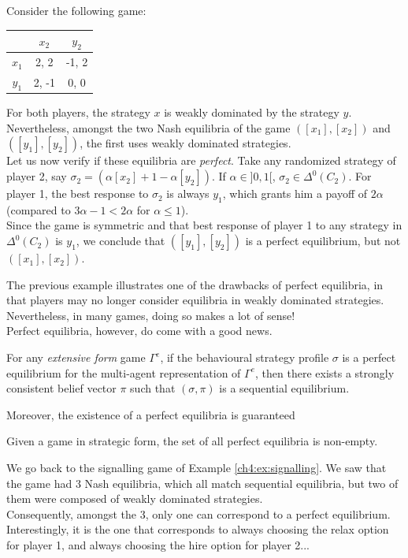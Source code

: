 \begin{example}
Consider the following game:
\begin{center}
\begin{tabular}{c | c  c}
& $x_2$ & $y_2$ \\
\hline 
$x_1$ & 2, 2 & -1, 2 \\ 
$y_1$ & 2, -1 & 0, 0
\end{tabular}
\end{center}
For both players, the strategy $x$ is weakly dominated by the strategy $y$. 
Nevertheless, amongst the two Nash equilibria of the game $([x_1],[x_2])$ and $([y_1],[y_2])$, the first uses weakly dominated strategies. \\
Let us now verify if these equilibria are \emph{perfect}. 
Take  any randomized strategy of player 2, say $\sigma_2 = (\alpha [x_2] + 1- \alpha [y_2])$. If $\alpha \in ]0,1[$, $\sigma_2 \in \Delta^0(C_2)$. For player 1, the best response to $\sigma_2$ is always $y_1$, which grants him a payoff of $2 \alpha$ (compared to $3\alpha - 1 < 2 \alpha$ for $\alpha \leq 1$).\\
Since the game is symmetric and that  best response of player 1 to any strategy in $\Delta^0(C_2)$ is $y_1$, we conclude that $([y_1], [y_2])$ is a perfect equilibrium, but not $([x_1],[x_2])$.
\end{example}

The previous example illustrates one of the drawbacks of perfect equilibria, in that players may no longer consider equilibria in weakly dominated strategies. Nevertheless, in many games, doing so makes a lot of sense!\\
Perfect equilibria, however, do come with a good news. 
\begin{theorem}
For any \emph{extensive form} game $\Gamma^e$, if the behavioural strategy profile $\sigma$  is a perfect equilibrium for the multi-agent representation of $\Gamma^e$, then there exists a strongly consistent belief vector $\pi$ such that $(\sigma, \pi)$ is a sequential equilibrium. 
\end{theorem}

Moreover, the existence of a perfect equilibria is guaranteed
\begin{theorem}
Given a game in strategic form, the set of all perfect equilibria is non-empty.
\end{theorem}
\begin{example}
We go back to the signalling game of Example \ref{ch4:ex:signalling}.
We saw that the game had 3 Nash equilibria, which all match sequential equilibria, but two of them were composed of weakly dominated strategies. \\
Consequently, amongst the 3, only one can correspond to a perfect equilibrium. 
Interestingly, it is the one that corresponds to always choosing the relax option for player 1, and always choosing the hire option for player 2...
\end{example}


